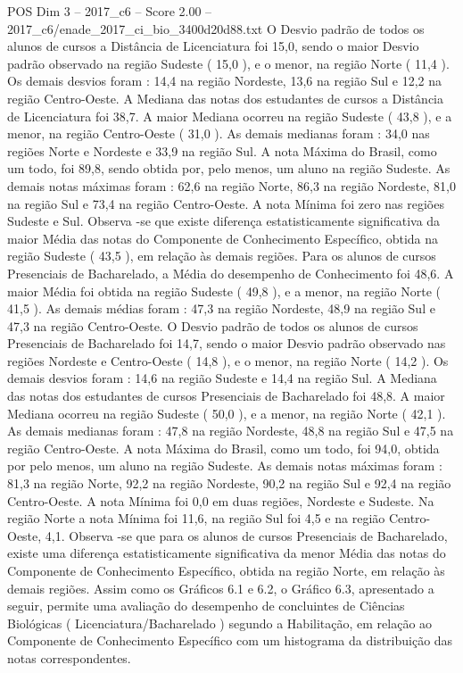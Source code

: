 \begin{textsample}{POS Dim 3 – 2017\_c6 – Score 2.00 – 2017\_c6/enade\_2017\_ci\_bio\_3400d20d88.txt}
O Desvio padrão de todos os alunos de cursos a Distância de Licenciatura foi 15,0, sendo o maior Desvio padrão observado na região Sudeste ( 15,0 ), e o menor, na região Norte ( 11,4 ).
Os demais desvios foram : 14,4 na região Nordeste, 13,6 na região Sul e 12,2 na região Centro-Oeste.
A Mediana das notas dos estudantes de cursos a Distância de Licenciatura foi 38,7.
A maior Mediana ocorreu na região Sudeste ( 43,8 ), e a menor, na região Centro-Oeste ( 31,0 ).
As demais medianas foram : 34,0 nas regiões Norte e Nordeste e 33,9 na região Sul.
A nota Máxima do Brasil, como um todo, foi 89,8, sendo obtida por, pelo menos, um aluno na região Sudeste.
As demais notas máximas foram : 62,6 na região Norte, 86,3 na região Nordeste, 81,0 na região Sul e 73,4 na região Centro-Oeste.
A nota Mínima foi zero nas regiões Sudeste e Sul.
Observa -se que existe diferença estatisticamente significativa da maior Média das notas do Componente de Conhecimento Específico, obtida na região Sudeste ( 43,5 ), em relação às demais regiões.
Para os alunos de cursos Presenciais de Bacharelado, a Média do desempenho de Conhecimento foi 48,6.
A maior Média foi obtida na região Sudeste ( 49,8 ), e a menor, na região Norte ( 41,5 ).
As demais médias foram : 47,3 na região Nordeste, 48,9 na região Sul e 47,3 na região Centro-Oeste.
O Desvio padrão de todos os alunos de cursos Presenciais de Bacharelado foi 14,7, sendo o maior Desvio padrão observado nas regiões Nordeste e Centro-Oeste ( 14,8 ), e o menor, na região Norte ( 14,2 ).
Os demais desvios foram : 14,6 na região Sudeste e 14,4 na região Sul.
A Mediana das notas dos estudantes de cursos Presenciais de Bacharelado foi 48,8.
A maior Mediana ocorreu na região Sudeste ( 50,0 ), e a menor, na região Norte ( 42,1 ).
As demais medianas foram : 47,8 na região Nordeste, 48,8 na região Sul e 47,5 na região Centro-Oeste.
A nota Máxima do Brasil, como um todo, foi 94,0, obtida por pelo menos, um aluno na região Sudeste.
As demais notas máximas foram : 81,3 na região Norte, 92,2 na região Nordeste, 90,2 na região Sul e 92,4 na região Centro-Oeste.
A nota Mínima foi 0,0 em duas regiões, Nordeste e Sudeste.
Na região Norte a nota Mínima foi 11,6, na região Sul foi 4,5 e na região Centro-Oeste, 4,1.
Observa -se que para os alunos de cursos Presenciais de Bacharelado, existe uma diferença estatisticamente significativa da menor Média das notas do Componente de Conhecimento Específico, obtida na região Norte, em relação às demais regiões.
Assim como os Gráficos 6.1 e 6.2, o Gráfico 6.3, apresentado a seguir, permite uma avaliação do desempenho de concluintes de Ciências Biológicas ( Licenciatura/Bacharelado ) segundo a Habilitação, em relação ao Componente de Conhecimento Específico com um histograma da distribuição das notas correspondentes.

\end{textsample}
